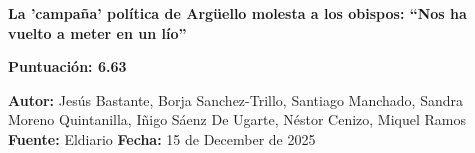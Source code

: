 \documentclass[10pt,a4paper]{article}
\begin{document}
\begin{center}
    {\Huge\bfseries La 'campa\~{n}a' pol\'{i}tica de Arg\"{u}ello molesta a los obispos: ``Nos ha vuelto a meter en un l\'{i}o''\par}
    \vspace{0.5em}
    {\large\bfseries Puntuación: 6.63\par}
\end{center}
\vspace{1em}

\noindent\textbf{Autor:} Jes\'{u}s Bastante, Borja Sanchez-Trillo, Santiago Manchado, Sandra Moreno Quintanilla, I\~{n}igo S\'{a}enz De Ugarte, N\'{e}stor Cenizo, Miquel Ramos \hfill \textbf{Fuente:} Eldiario \hfill \textbf{Fecha:} 15 de December de 2025\par
\vspace{1em}

\end{document}
